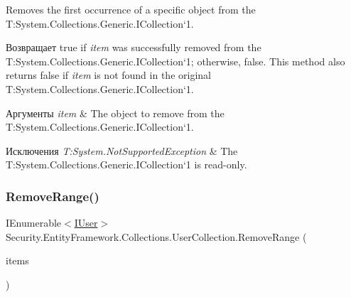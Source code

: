 Removes the first occurrence of a specific object from the T\+:\+System.\+Collections.\+Generic.\+I\+Collection`1. 

\begin{DoxyReturn}{Возвращает}
true if {\itshape item}  was successfully removed from the T\+:\+System.\+Collections.\+Generic.\+I\+Collection`1; otherwise, false. This method also returns false if {\itshape item}  is not found in the original T\+:\+System.\+Collections.\+Generic.\+I\+Collection`1. 
\end{DoxyReturn}

\begin{DoxyParams}{Аргументы}
{\em item} & The object to remove from the T\+:\+System.\+Collections.\+Generic.\+I\+Collection`1.\\
\hline
\end{DoxyParams}

\begin{DoxyExceptions}{Исключения}
{\em T\+:\+System.\+Not\+Supported\+Exception} & The T\+:\+System.\+Collections.\+Generic.\+I\+Collection`1 is read-\/only.\\
\hline
\end{DoxyExceptions}
\mbox{\label{class_security_1_1_entity_framework_1_1_collections_1_1_user_collection_a0c6936660dfede0da76da7147467775c}} 
\subsubsection{\texorpdfstring{Remove\+Range()}{RemoveRange()}}
{\footnotesize\ttfamily I\+Enumerable$<$\hyperlink{interface_security_1_1_interfaces_1_1_model_1_1_i_user}{I\+User}$>$ Security.\+Entity\+Framework.\+Collections.\+User\+Collection.\+Remove\+Range (\begin{DoxyParamCaption}\item[{I\+Enumerable$<$ \hyperlink{interface_security_1_1_interfaces_1_1_model_1_1_i_user}{I\+User} $>$}]{items }\end{DoxyParamCaption})}



